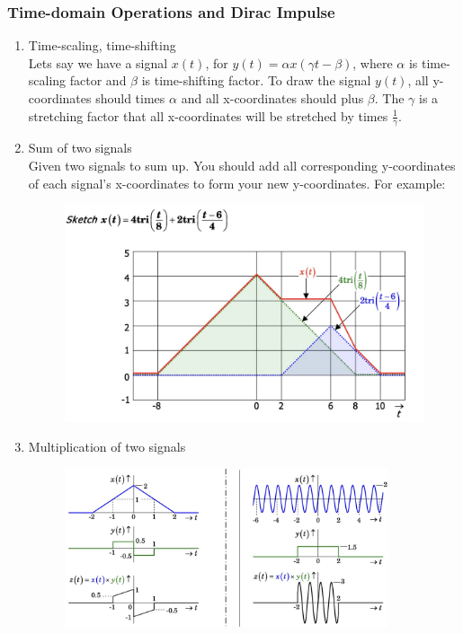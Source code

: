\documentclass{article}
\begin{document}
\subsubsection{Time-domain Operations and Dirac Impulse}
\begin{enumerate}
    \item Time-scaling, time-shifting \\
    Lets say we have a signal $x(t)$, for $y(t) = \alpha x(\gamma t - \beta)$, where $\alpha$ is time-scaling factor and $\beta$ is time-shifting factor. To draw the signal $y(t)$, all y-coordinates should times $\alpha$ and all x-coordinates should plus $\beta$. The $\gamma$ is a stretching factor that all x-coordinates will be stretched by times $\frac{1}{\gamma}$.  
    \item Sum of two signals \\
    Given two signals to sum up. You should add all corresponding y-coordinates of each signal's 
    x-coordinates to form your new y-coordinates. 
    \newpage
    For example:
    \begin{figure}[h]
        \centering
        \includegraphics[width=1\textwidth]{image/triangle_add_example.jpg}
        \label{fig:enter-label}
    \end{figure}
    \item Multiplication of two signals
    \begin{figure}[h]
        \centering
        \includegraphics[width=0.9\textwidth]{image/mutiplication.jpg}

\end{figure}
\end{enumerate}
\end{document}
